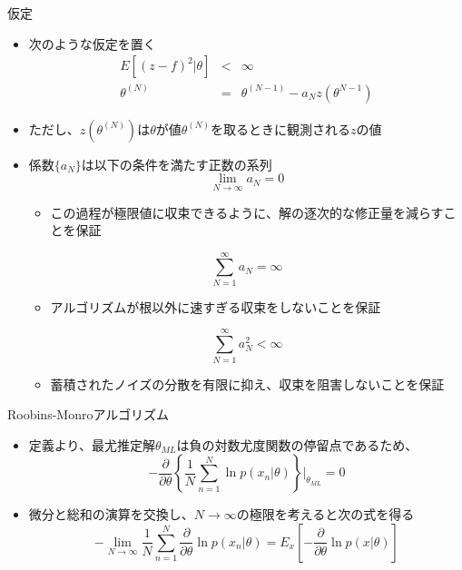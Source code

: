 \begin{frame}{仮定}
 \begin{itemize}
  \item 次のような仮定を置く
        \begin{eqnarray}
         E[(z-f)^2|\theta] &<& \infty\\
         \theta^{(N)}&=& \theta^{(N-1)}-a_Nz(\theta^{N-1})
        \end{eqnarray}
  \item ただし、$z(\theta^{(N)})$は$\theta$が値$\theta^{(N)}$を取るときに観測される$z$の値
  \item 係数$\{a_N\}$は以下の条件を満たす正数の系列
        \begin{equation}
         \lim_{N \rightarrow \infty}a_N=0
        \end{equation}
        \begin{itemize}
         \item この過程が極限値に収束できるように、解の逐次的な修正量を減らすことを保証
        \end{itemize}
        \begin{equation}
         \sum_{N=1}^{\infty}a_N=\infty
        \end{equation}
        \begin{itemize}
         \item アルゴリズムが根以外に速すぎる収束をしないことを保証
        \end{itemize}
        \begin{equation}
         \sum_{N=1}^{\infty}a_N^2 < \infty
        \end{equation}
        \begin{itemize}
         \item 蓄積されたノイズの分散を有限に抑え、収束を阻害しないことを保証
        \end{itemize}
 \end{itemize}
\end{frame}

\begin{frame}{Roobins-Monroアルゴリズム}
 \begin{itemize}
  \item 定義より、最尤推定解$\theta_{ML}$は負の対数尤度関数の停留点であるため、
        \begin{equation}
         -\frac{\partial }{\partial \theta}\left\{\frac{1}{N}\sum_{n=1}^{N}\ln  p(x_n|\theta)\right\}|_{\theta_{ML}} = 0
        \end{equation}
  \item 微分と総和の演算を交換し、$N\rightarrow\infty$の極限を考えると次の式を得る
        \begin{equation}
         -\lim_{N \rightarrow \infty}\frac{1}{N}\sum_{n=1}^{N}\frac{\partial}{\partial \theta}\ln p(x_n|\theta)=E_x\left[-\frac{\partial}{\partial \theta}\ln p(x|\theta)\right]
        \end{equation}
 \end{itemize}
\end{frame}

